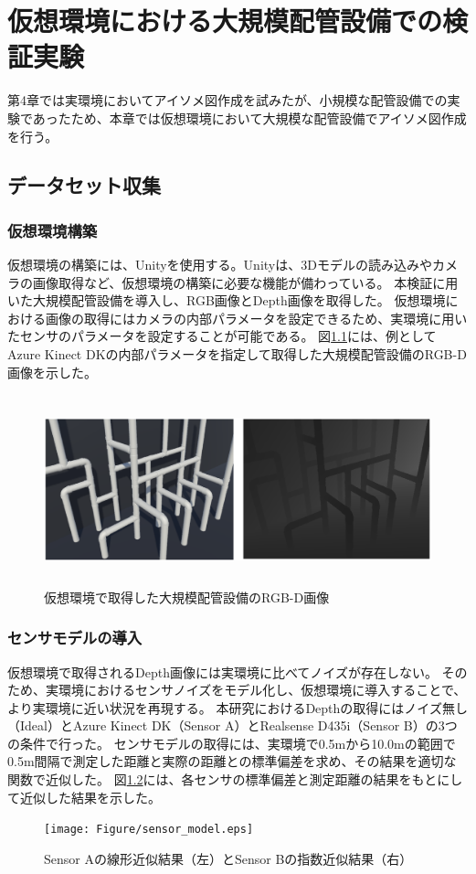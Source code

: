 ﻿\chapter{仮想環境における大規模配管設備での検証実験}
第4章では実環境においてアイソメ図作成を試みたが、小規模な配管設備での実験であったため、本章では仮想環境において大規模な配管設備でアイソメ図作成を行う。

\section{データセット収集}
\subsection{仮想環境構築}
仮想環境の構築には、Unityを使用する。Unityは、3Dモデルの読み込みやカメラの画像取得など、仮想環境の構築に必要な機能が備わっている。
本検証に用いた大規模配管設備を導入し、RGB画像とDepth画像を取得した。
仮想環境における画像の取得にはカメラの内部パラメータを設定できるため、実環境に用いたセンサのパラメータを設定することが可能である。
図\ref{fig:f1}には、例としてAzure Kinect DKの内部パラメータを指定して取得した大規模配管設備のRGB-D画像を示した。
\begin{figure}[htbt]
    \centering
    \includegraphics[height=55mm]{Figure/ex_sim.eps}
    \caption{仮想環境で取得した大規模配管設備のRGB-D画像}
    \label{fig:f1}
\end{figure}

\subsection{センサモデルの導入}
仮想環境で取得されるDepth画像には実環境に比べてノイズが存在しない。
そのため、実環境におけるセンサノイズをモデル化し、仮想環境に導入することで、より実環境に近い状況を再現する。
本研究におけるDepthの取得にはノイズ無し（Ideal）とAzure Kinect DK（Sensor A）とRealsense D435i（Sensor B）の3つの条件で行った。
センサモデルの取得には、実環境で0.5mから10.0mの範囲で0.5m間隔で測定した距離と実際の距離との標準偏差を求め、その結果を適切な関数で近似した。
図\ref{fig:f2}には、各センサの標準偏差と測定距離の結果をもとにして近似した結果を示した。
\begin{figure}[htbt]
    \centering
    \texttt{[image: Figure/sensor\_model.eps]}
    \caption{Sensor Aの線形近似結果（左）とSensor Bの指数近似結果（右）}
    \label{fig:f2}
\end{figure}

